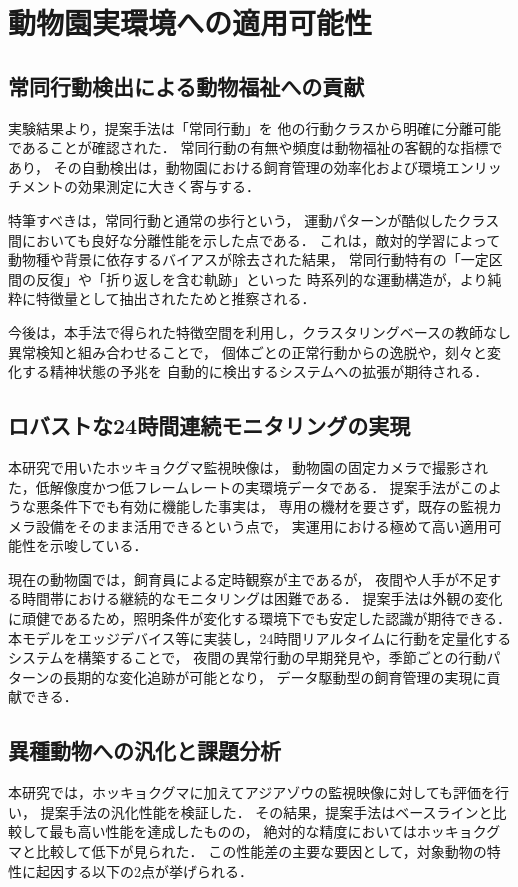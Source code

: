 \section{動物園実環境への適用可能性}

\subsection{常同行動検出による動物福祉への貢献}
実験結果より，提案手法は「常同行動」を
他の行動クラスから明確に分離可能であることが確認された．
常同行動の有無や頻度は動物福祉の客観的な指標であり，
その自動検出は，動物園における飼育管理の効率化および環境エンリッチメントの効果測定に大きく寄与する．

特筆すべきは，常同行動と通常の歩行という，
運動パターンが酷似したクラス間においても良好な分離性能を示した点である．
これは，敵対的学習によって動物種や背景に依存するバイアスが除去された結果，
常同行動特有の「一定区間の反復」や「折り返しを含む軌跡」といった
時系列的な運動構造が，より純粋に特徴量として抽出されたためと推察される．

今後は，本手法で得られた特徴空間を利用し，クラスタリングベースの教師なし異常検知と組み合わせることで，
個体ごとの正常行動からの逸脱や，刻々と変化する精神状態の予兆を
自動的に検出するシステムへの拡張が期待される．

\subsection{ロバストな24時間連続モニタリングの実現}
本研究で用いたホッキョクグマ監視映像は，
動物園の固定カメラで撮影された，低解像度かつ低フレームレートの実環境データである．
提案手法がこのような悪条件下でも有効に機能した事実は，
専用の機材を要さず，既存の監視カメラ設備をそのまま活用できるという点で，
実運用における極めて高い適用可能性を示唆している．

現在の動物園では，飼育員による定時観察が主であるが，
夜間や人手が不足する時間帯における継続的なモニタリングは困難である．
提案手法は外観の変化に頑健であるため，照明条件が変化する環境下でも安定した認識が期待できる．
本モデルをエッジデバイス等に実装し，24時間リアルタイムに行動を定量化するシステムを構築することで，
夜間の異常行動の早期発見や，季節ごとの行動パターンの長期的な変化追跡が可能となり，
データ駆動型の飼育管理の実現に貢献できる．

\subsection{異種動物への汎化と課題分析}
本研究では，ホッキョクグマに加えてアジアゾウの監視映像に対しても評価を行い，
提案手法の汎化性能を検証した．
その結果，提案手法はベースラインと比較して最も高い性能を達成したものの，
絶対的な精度においてはホッキョクグマと比較して低下が見られた．
この性能差の主要な要因として，対象動物の特性に起因する以下の2点が挙げられる．

